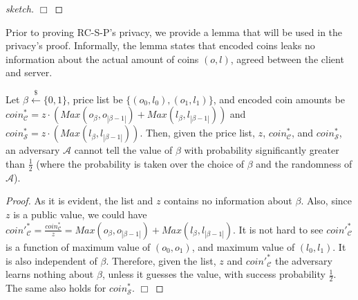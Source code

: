 \begin{proof}[sketch]
 \hfill\(\Box\)\end{proof}
  
  
  Prior to proving  RC-S-P's privacy, we provide a lemma that will be used in the privacy's proof. Informally, the lemma states that encoded coins leaks no information about the actual amount of coins $(o,l)$, agreed between the client and server. 


\begin{lemma}\label{lemma::encoded-coins} Let $\beta\stackrel{\scriptscriptstyle\$}\leftarrow\{0,1\}$, price list be $\{(o_{\scriptscriptstyle 0},l_{\scriptscriptstyle 0}),(o_{\scriptscriptstyle 1},l_{\scriptscriptstyle 1})\}$, and encoded coin amounts be $coin^{\scriptscriptstyle *}_{\scriptscriptstyle\mathcal{C}}= z\cdot(Max(o_{\scriptscriptstyle\beta},o_{\scriptscriptstyle|\beta-1|})+Max(l_{\scriptscriptstyle\beta},l_{\scriptscriptstyle|\beta-1|}))$ and $coin^{\scriptscriptstyle *}_{\scriptscriptstyle\mathcal{S}}=z\cdot(Max(l_{\scriptscriptstyle\beta}, l_{\scriptscriptstyle |\beta-1|}))$. Then, given the price list, $z$, $coin^{\scriptscriptstyle *}_{\scriptscriptstyle\mathcal{C}}$, and $coin^{\scriptscriptstyle *}_{\scriptscriptstyle\mathcal{S}}$, an adversary $\mathcal{A}$ cannot tell the value of $\beta$ with probability significantly greater than $\frac{1}{2}$ (where the probability is taken over the choice of $\beta$ and the randomness of $\mathcal{A}$).
\end{lemma}



\begin{proof}
As it is evident, the list and $z$ contains no information about $\beta$. Also, since  $z$ is a public value, we could have   $coin'^{\scriptscriptstyle *}_{\scriptscriptstyle\mathcal C}=\frac{coin^{\scriptscriptstyle *}_{\scriptscriptstyle\mathcal C}}{z} = Max(o_{\scriptscriptstyle\beta},o_{\scriptscriptstyle|\beta-1|})+Max(l_{\scriptscriptstyle\beta}, l_{\scriptscriptstyle|\beta-1|})$. It is not hard to see $coin'^{\scriptscriptstyle *}_{\scriptscriptstyle\mathcal C}$ is a function of maximum value of $(o_{\scriptscriptstyle 0},o_{\scriptscriptstyle 1})$, and maximum value of $(l_{\scriptscriptstyle 0},l_{\scriptscriptstyle 1})$. It is also  independent of $\beta$. Therefore, given the list, $z$ and $coin'^{\scriptscriptstyle *}_{\scriptscriptstyle\mathcal C}$ the adversary learns nothing about $\beta$, unless it guesses the value,  with  success probability $\frac{1}{2}$. The same also holds for $coin^{\scriptscriptstyle *}_{\scriptscriptstyle\mathcal S}$. 
 \hfill\(\Box\)\end{proof}


